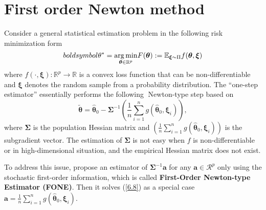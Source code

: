 \documentclass[12pt]{article}
\numberwithin{equation}{section}
\begin{document}
\section{First order Newton method}
Consider a general statistical estimation problem in the following risk minimization form
\begin{equation}
\\boldsymbol{\theta}^{*}=\underset{\boldsymbol{\theta} \in \mathbb{R}^{p}}{\arg \min } F(\boldsymbol{\theta}):=\mathbb{E}_{\boldsymbol{\xi} \sim \Pi} f(\boldsymbol{\theta}, \boldsymbol{\xi})
\end{equation}
where $f(\cdot, \boldsymbol{\xi}): \mathbb{R}^{p} \rightarrow \mathbb{R}$ is a convex loss function that can be non-differentiable and $\boldsymbol{\xi}$ denotes the random sample from a probability distribution. The “one-step estimator” essentially performs the following 􏰪Newton-type step based on
\begin{equation}\label{6.8}
\widetilde{\boldsymbol{\theta}}=\widehat{\boldsymbol{\theta}}_{0}-\boldsymbol{\Sigma}^{-1}\left(\frac{1}{n} \sum_{i=1}^{n} g\left(\widehat{\boldsymbol{\theta}}_{0}, \boldsymbol{\xi}_{i}\right)\right),
\end{equation}
where $\boldsymbol{\Sigma}$ is the population Hessian matrix and $\left(\frac{1}{n} \sum_{i=1}^{n} g\left(\widehat{\boldsymbol{\theta}}_{0}, \boldsymbol{\xi}_{i}\right)\right)$ is the subgradient vector. The estimation of $\boldsymbol{\Sigma}$ is not easy when $f$ is non-differentiable or in high-dimensional situation, and the empirical Hessian matrix does not exist. 

To address this issue, \citet*{chen2018first} propose an estimator of $\boldsymbol{\Sigma}^{-1}\boldsymbol{a}$ for any $\boldsymbol{a}\in \mathcal{R}^p$ only using the stochastic first-order information, which is called \textbf{First-Order Newton-type Estimator (FONE)}. Then it solves (\ref{6.8}) as a special case $\boldsymbol{a}=\frac{1}{n} \sum_{i=1}^{n} g\left(\widehat{\boldsymbol{\theta}}_{0}, \boldsymbol{\xi}_{i}\right)$.
\end{document}
